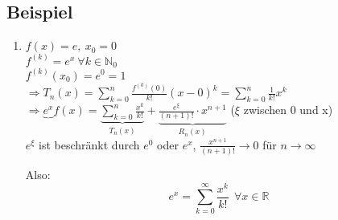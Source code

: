 \subsection{Beispiel}
\begin{enumerate}
	\item
	$f(x)=e, \ x_0=0$\\
	$f^{(k)}=e^x \ \forall k\in \mathbb{N}_0$\\
	$f^{(k)}(x_0)=e^0=1$\\
	$\Rightarrow T_n(x)=\sum_{k=0}^n \frac{f^{(k)}(0)}{k!}(x-0)^k = \sum_{k=0}^n \frac{1}{k!}x^k$\\
	$\Rightarrow \underbrace{e^x}{f(x)}=\underbrace{\sum_{k=0}^n \frac{x^k}{k!}}_{T_n(x)}+\underbrace{\frac{e^\xi}{(n+1)!}\cdot x^{n+1}}_{R_n(x)}$ ($\xi$ zwischen 0 und x)\\
	$e^\xi$ ist beschränkt durch $e^0$ oder $e^x$, $\frac{x^{n+1}}{(n+1)!}\rightarrow 0$ für $n\rightarrow \infty$
	
	Also:\\
	\[e^x=\sum_{k=0}^\infty \frac{x^k}{k!} \ \ \forall x\in\mathbb{R}\]
\end{enumerate}